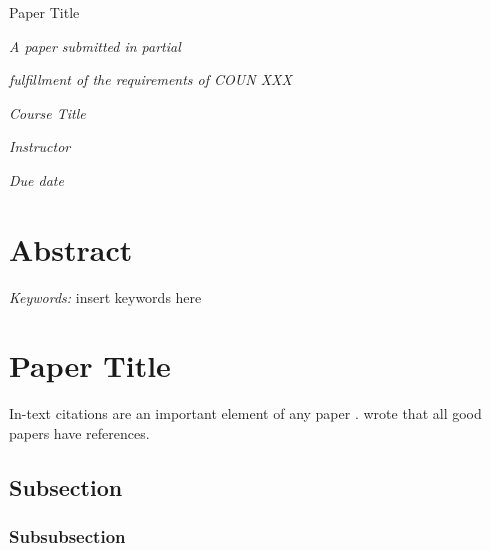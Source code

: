 \documentclass[12pt]{article}
\author{Author}
\title{\papertitle}
\newcommand{\papertitle}{Paper Title}
\newcommand{\coursetitle}{Course Title}
\newcommand{\instructor}{Instructor}
\newcommand{\duedate}{Due date}
\renewcommand{\maketitle}{
  \begin{center}
    \vspace*{150pt}

    \begin{singlespace}
      \papertitle

      \theauthor
    \end{singlespace}

    \vspace{50pt}

    \textit{A paper submitted in partial}

    \textit{fulfillment of the requirements of COUN XXX}

    \textit{\coursetitle}

    \textit{\instructor}

    \textit{\duedate}
  \end{center}
}
\begin{document}

\maketitle

\newpage



\section{Abstract}
\setlength{\parindent}{0in}

\lipsum[6]

\setlength{\parindent}{.5in}

\textit{Keywords:} insert keywords here

\newpage



\section{\papertitle}

In-text citations are an important element of any paper \parencite{test_1}.
\textcite{test_2} wrote that all good papers have references.

\subsection{Subsection}

\lipsum[5]

\subsubsection{Subsubsection}

\lipsum[5]



\newpage

\printbibliography
\end{document}
